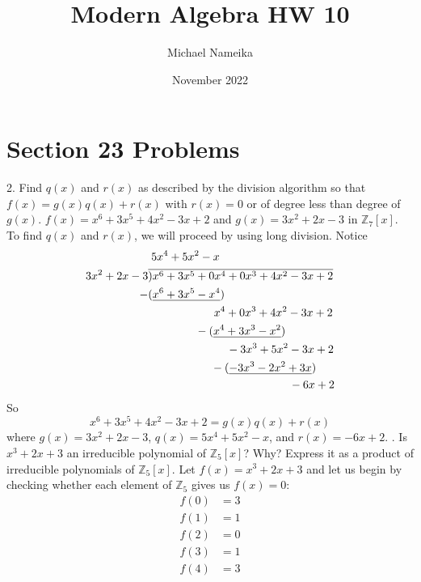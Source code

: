 \documentclass{article}
\title{Modern Algebra HW 10}
\author{Michael Nameika}
\date{November 2022}
\newcommand\showdiv[1]{\overline{\smash{)}#1}}
\begin{document}
\maketitle

\section*{Section 23 Problems}
2. Find $q(x)$ and $r(x)$ as described by the division algorithm so that $f(x) = g(x)q(x) + r(x)$ with $r(x) = 0$ or of degree less than degree of $g(x)$.
\newline\newline
$f(x) = x^6 + 3x^5 + 4x^2 - 3x + 2$ and $g(x) = 3x^2 + 2x - 3$ in $\mathbb{Z}_7[x]$.
\newline\newline
To find $q(x)$ and $r(x)$, we will proceed by using long division. Notice
\begin{align*}
    &\; 5x^4  + 5x^2 - x\\
    3x^2 + 2x - 3&\showdiv{x^6 + 3x^5 + 0x^4 + 0x^3 + 4x^2 - 3x + 2} \\
    -&(\underline{x^6 + 3x^5 - x^4}) \\
    &\;\;\;\;\;\;\;\;\;\;\;\;\;\;\;\;\;\;\;\;\; x^4 + 0x^3 + 4x^2 - 3x + 2 \\
    &\;\;\;\;\;\;\;\;\;\;\;\;\;\;\;-(\underline{x^4 + 3x^3 - x^2}) \\
    &\;\;\;\;\;\;\;\;\;\;\;\;\;\;\;\;\;\;\;\;\;\;\;\;\;-3x^3 + 5x^2 - 3x + 2 \\
    &\;\;\;\;\;\;\;\;\;\;\;\;\;\;\;\;\;\;\;\;-(\underline{-3x^3 - 2x^2 + 3x}) \\
    &\;\;\;\;\;\;\;\;\;\;\;\;\;\;\;\;\;\;\;\;\;\;\;\;\;\;\;\;\;\;\;\;\;\;\;\;\;\;\;\;\;\;\;\;\;-6x + 2 \\
\end{align*}
So 
\[x^6 + 3x^5 + 4x^2 - 3x + 2 = g(x)q(x) + r(x)\]
where $g(x) = 3x^2 + 2x - 3$, $q(x) = 5x^4 + 5x^2 - x$, and $r(x) = -6x + 2$.
\newline{}. Is $x^3 + 2x + 3$ an irreducible polynomial of $\mathbb{Z}_5[x]$? Why? Express it as a product of irreducible polynomials of $\mathbb{Z}_5[x]$.
\newline\newline
Let $f(x) = x^3 + 2x + 3$ and let us begin by checking whether each element of $\mathbb{Z}_5$ gives us $f(x) = 0$:
\begin{align*}
    f(0) &= 3 \\
    f(1) &= 1 \\
    f(2) &= 0 \\
    f(3) &= 1 \\
    f(4) &= 3 \\
\end{align*}
\end{document}
